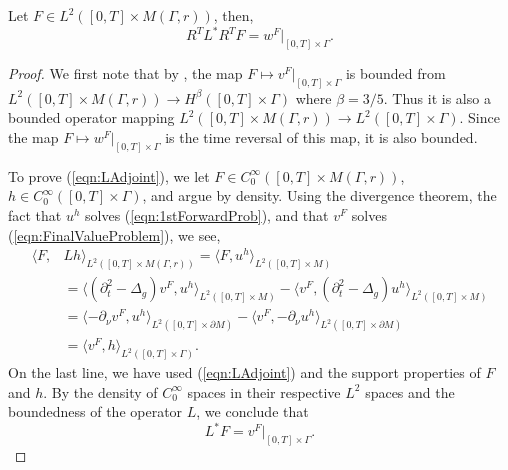 \documentclass[final,leqno]{siamart1116}
\begin{document}
\begin{lemma}
  \label{lemma:Ltranspose}
  Let $F \in L^2([0,T] \times M(\Gamma,r))$, then,
  \begin{equation}
    \label{eqn:LAdjoint}
    R^T L^* R^T F =  w^F
    |_{[0,T]\times\Gamma}.
  \end{equation}
  
  
  
\end{lemma}
\begin{proof}
  We first note that by \cite[Thm 2.0.0]{Lasiecka1991}, the map $F
  \mapsto v^F|_{[0,T] \times \Gamma}$ is bounded from $L^2([0,T]
  \times M(\Gamma,r)) \rightarrow H^\beta([0,T] \times \Gamma)$ where
  $\beta = 3/5$. Thus it is also a bounded operator mapping $L^2([0,T]
  \times M(\Gamma,r)) \rightarrow L^2([0,T] \times \Gamma)$. Since the
  map $F \mapsto w^F|_{[0,T] \times \Gamma}$ is the time reversal of
  this map, it is also bounded.
    
  To prove (\ref{eqn:LAdjoint}), we let $F \in C_0^{\infty}([0,T] \times
  M(\Gamma,r))$, $h \in C_0^\infty([0,T] \times \Gamma)$, and argue by
  density. Using the divergence theorem, the fact that $u^h$ solves
  (\ref{eqn:1stForwardProb}), and that $v^F$ solves
  (\ref{eqn:FinalValueProblem}), we see,
  \begin{align*}
    \langle F, &Lh \rangle_{L^2([0,T] \times M(\Gamma,r))} = \langle F, u^h \rangle_{L^2([0,T] \times M)} \\ 
    &= \langle ({\partial}_t^2 - \Delta_g) v^F, u^h \rangle_{L^2([0,T] \times M)} - \langle v^F, ({\partial}_t^2 - \Delta_g) u^h\rangle_{L^2([0,T] \times M)}\\
    &= \langle -{{\partial}_{\nu}} v^F, u^h \rangle_{L^2([0,T] \times {\partial} M)} - \langle v^F, -{{\partial}_{\nu}} u^h\rangle_{L^2([0,T] \times {\partial} M)}\\
    &= \langle v^F, h \rangle_{L^2([0,T] \times \Gamma)}.
  \end{align*}
  On the last line, we have used (\ref{eqn:LAdjoint}) and the support
  properties of $F$ and $h$. By the density of $C_0^\infty$ spaces in
  their respective $L^2$ spaces and the boundedness of the operator
  $L$, we conclude that
  \begin{equation}
    \label{eqn:LTranspose}
    L^* F = v^F|_{[0,T] \times \Gamma}.
  \end{equation}


\end{proof}
\end{document}
